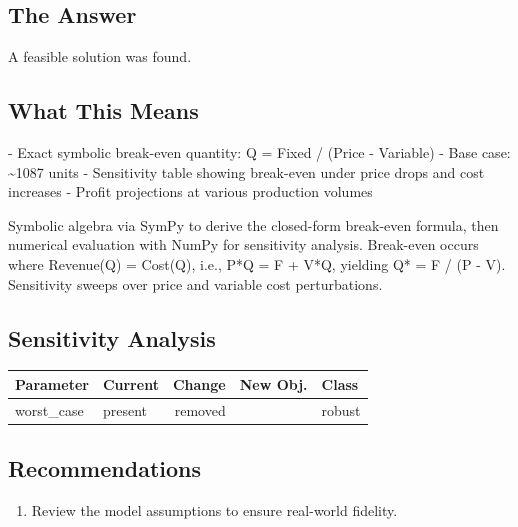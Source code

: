 \documentclass[11pt, a4paper]{article}
\begin{document}
\subsection{The Answer}

\begin{polyainsight}[title={Bottom Line}]
A feasible solution was found.
\end{polyainsight}

\subsection{What This Means}

- Exact symbolic break-even quantity: Q = Fixed / (Price - Variable)
- Base case: \textasciitilde{}1087 units
- Sensitivity table showing break-even under price drops and cost increases
- Profit projections at various production volumes

Symbolic algebra via SymPy to derive the closed-form break-even formula, then numerical evaluation with NumPy for sensitivity analysis. Break-even occurs where Revenue(Q) = Cost(Q), i.e., P*Q = F + V*Q, yielding Q* = F / (P - V). Sensitivity sweeps over price and variable cost perturbations.

\subsection{Sensitivity Analysis}

\begin{longtable}{llrrl}
\toprule
\textbf{Parameter} & \textbf{Current} & \textbf{Change} & \textbf{New Obj.} & \textbf{Class} \\
\midrule
\endhead
worst\_case & present & removed &  &
\textcolor{polyagreen}{robust} \\
\bottomrule
\end{longtable}


\subsection{Recommendations}

\begin{enumerate}
  \item Review the model assumptions to ensure real-world fidelity.
\end{enumerate}
\end{document}
